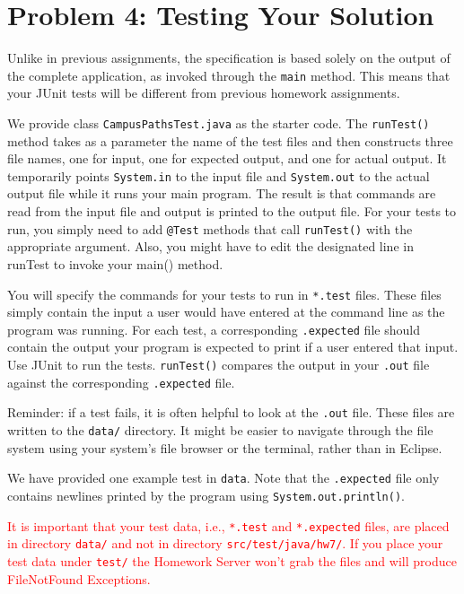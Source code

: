 \documentclass[11pt]{article}
\begin{document}
\section*{Problem 4: Testing Your Solution}
\label{sec:Problem 4}

Unlike in previous assignments, the specification is based solely on the output of the complete application, as invoked through the \texttt{main} method. This means that your JUnit tests will be different from previous homework assignments.

\noindent We provide class \texttt{CampusPathsTest.java} as the starter code. The \texttt{runTest()} method takes as a parameter the name of the test files and then constructs three file names, one for input, one for expected output, and one for actual output. It temporarily points \texttt{System.in} to the input file and \texttt{System.out} to the actual output file while it runs your main program. The result is that commands are read from the input file and output is printed to the output file. For your tests to run, you simply need to add \texttt{@Test} methods that call \texttt{runTest()} with the appropriate argument. Also, you might have to edit the designated line in runTest to invoke your main() method.

\noindent You will specify the commands for your tests to run in \texttt{*.test} files. These files simply contain the input a user would have entered at the command line as the program was running. For each test, a corresponding \texttt{.expected} file should contain the output your program is expected to print if a user entered that input. Use JUnit to run the tests. \texttt{runTest()} compares the output in your \texttt{.out} file against the corresponding \texttt{.expected} file.

\noindent Reminder: if a test fails, it is often helpful to look at the \texttt{.out} file. These files are written to the \texttt{data/} directory. It might be easier to navigate through the file system using your system's file browser or the terminal, rather than in Eclipse.

\noindent We have provided one example test in \texttt{data}. Note that the \texttt{.expected} file only contains newlines printed by the program using \texttt{System.out.println()}.
\newpage

\noindent \textcolor{red}{It is important that your test data, i.e., \texttt{*.test} and \texttt{*.expected} files, are placed in directory \texttt{data/} and not in directory \texttt{src/test/java/hw7/}. If you place your test data under \texttt{test/} the Homework Server won't grab the files and will produce FileNotFound Exceptions.}
\end{document}
